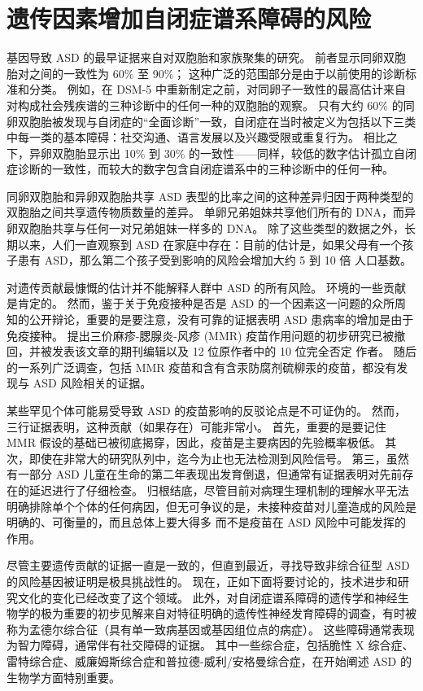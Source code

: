 \section{遗传因素增加自闭症谱系障碍的风险}

基因导致 ASD 的最早证据来自对双胞胎和家族聚集的研究。 前者显示同卵双胞胎对之间的一致性为 60\% 至 90\%； 这种广泛的范围部分是由于以前使用的诊断标准和分类。 例如，在 DSM-5 中重新制定之前，对同卵子一致性的最高估计来自对构成社会残疾谱的三种诊断中的任何一种的双胞胎的观察。 只有大约 60\% 的同卵双胞胎被发现与自闭症的“全面诊断”一致，自闭症在当时被定义为包括以下三类中每一类的基本障碍：社交沟通、语言发展以及兴趣受限或重复行为。 相比之下，异卵双胞胎显示出 10\% 到 30\% 的一致性——同样，较低的数字估计孤立自闭症诊断的一致性，而较大的数字包含自闭症谱系中的三种诊断中的任何一种。

同卵双胞胎和异卵双胞胎共享 ASD 表型的比率之间的这种差异归因于两种类型的双胞胎之间共享遗传物质数量的差异。 单卵兄弟姐妹共享他们所有的 DNA，而异卵双胞胎共享与任何一对兄弟姐妹一样多的 DNA。 除了这些类型的数据之外，长期以来，人们一直观察到 ASD 在家庭中存在：目前的估计是，如果父母有一个孩子患有 ASD，那么第二个孩子受到影响的风险会增加大约 5 到 10 倍 人口基数。

对遗传贡献最慷慨的估计并不能解释人群中 ASD 的所有风险。 环境的一些贡献是肯定的。 然而，鉴于关于免疫接种是否是 ASD 的一个因素这一问题的众所周知的公开辩论，重要的是要注意，没有可靠的证据表明 ASD 患病率的增加是由于免疫接种。 提出三价麻疹-腮腺炎-风疹 (MMR) 疫苗作用问题的初步研究已被撤回，并被发表该文章的期刊编辑以及 12 位原作者中的 10 位完全否定 作者。 随后的一系列广泛调查，包括 MMR 疫苗和含有含汞防腐剂硫柳汞的疫苗，都没有发现与 ASD 风险相关的证据。

某些罕见个体可能易受导致 ASD 的疫苗影响的反驳论点是不可证伪的。 然而，三行证据表明，这种贡献（如果存在）可能非常小。 首先，重要的是要记住 MMR 假设的基础已被彻底揭穿，因此，疫苗是主要病因的先验概率极低。 其次，即使在非常大的研究队列中，迄今为止也无法检测到风险信号。 第三，虽然有一部分 ASD 儿童在生命的第二年表现出发育倒退，但通常有证据表明对先前存在的延迟进行了仔细检查。 归根结底，尽管目前对病理生理机制的理解水平无法明确排除单个个体的任何病因，但无可争议的是，未接种疫苗对儿童造成的风险是明确的、可衡量的，而且总体上要大得多 而不是疫苗在 ASD 风险中可能发挥的作用。

尽管主要遗传贡献的证据一直是一致的，但直到最近，寻找导致非综合征型 ASD 的风险基因被证明是极具挑战性的。 现在，正如下面将要讨论的，技术进步和研究文化的变化已经改变了这个领域。 此外，对自闭症谱系障碍的遗传学和神经生物学的极为重要的初步见解来自对特征明确的遗传性神经发育障碍的调查，有时被称为孟德尔综合征（具有单一致病基因或基因组位点的病症）。 这些障碍通常表现为智力障碍，通常伴有社交障碍的证据。 其中一些综合症，包括脆性 X 综合症、雷特综合症、威廉姆斯综合症和普拉德-威利/安格曼综合症，在开始阐述 ASD 的生物学方面特别重要。


